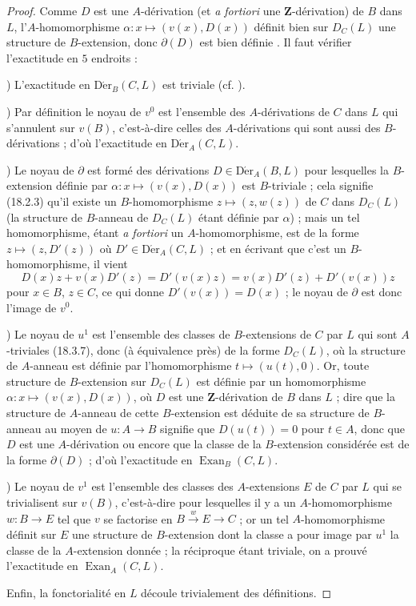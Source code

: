\begin{proof}
Comme $D$ est une $A$-dérivation (et \emph{a fortiori} une
$\mathbf{Z}$-dérivation) de $B$ dans $L$, l'$A$-homomorphisme
$\alpha:x\mapsto(v(x),D(x))$ définit bien sur $D_C(L)$ une structure de
$B$-extension, donc $\partial(D)$ est bien définie . Il
faut vérifier l'exactitude en $5$ endroits :

\medskip
{})\enspace
L'exactitude en $\operatorname{D\acute{e}r}_B(C,L)$ est triviale (cf.
).

\medskip
{})\enspace
Par définition  le noyau de $v^0$ est l'ensemble des
$A$-dérivations de $C$ dans $L$ qui s'annulent sur $v(B)$, c'est-à-dire
celles des $A$-dérivations qui sont aussi des $B$-dérivations
 ; d'où l'exactitude en $\operatorname{D\acute{e}r}_A(C,L)$.

\medskip
{})\enspace
Le noyau de $\partial$ est formé des dérivations
$D\in\operatorname{D\acute{e}r}_A(B,L)$ pour lesquelles la $B$-extension définie par
$\alpha:x\mapsto(v(x),D(x))$ est $B$-triviale ; cela signifie (18.2.3) qu'il
existe un $B$-homomorphisme $z\mapsto(z,w(z))$ de $C$ dans $D_C(L)$ (la
structure de $B$-anneau de $D_C(L)$ étant définie par $\alpha$) ; mais un tel
homomorphisme, étant \emph{a fortiori} un $A$-homomorphisme, est de la forme
$z\mapsto(z,D'(z))$ où $D'\in\operatorname{D\acute{e}r}_A(C,L)$
 ; et en écrivant que c'est un $B$-homomorphisme, il vient
\[
  D(x)z+v(x)D'(z)=D'(v(x)z)=v(x)D'(z)+D'(v(x))z
\]
pour $x\in B$, $z\in C$, ce qui donne $D'(v(x))=D(x)$ ; le noyau de
$\partial$ est donc l'image de $v^0$.

\medskip
{})\enspace
Le noyau de $u^1$ est l'ensemble des classes de $B$-extensions de $C$ par
$L$ qui sont $A$-triviales (18.3.7), donc (à équivalence près) de la forme
$D_C(L)$, où la structure de $A$-anneau est définie par l'homomorphisme
$t\mapsto(u(t),0)$. Or, toute structure de $B$-extension sur $D_C(L)$ est
définie par un homomorphisme $\alpha:x\mapsto(v(x),D(x))$, où $D$ est une
$\mathbf{Z}$-dérivation de $B$ dans $L$  ; dire que la
structure de $A$-anneau de cette $B$-extension est déduite de sa structure de
$B$-anneau au moyen de $u:A\to B$ signifie que $D(u(t))=0$ pour $t\in A$,
donc que $D$ est une $A$-dérivation ou encore que la classe de la $B$-extension
considérée est de la forme $\partial(D)$ ; d'où l'exactitude en
$\operatorname{Exan}_B(C,L)$.

\medskip
{})\enspace
Le noyau de $v^1$ est l'ensemble des classes des $A$-extensions $E$ de $C$
par $L$ qui se trivialisent sur $v(B)$, c'est-à-dire pour lesquelles il y a un
$A$-homomorphisme $w:B\to E$ tel que $v$ se factorise en
$B\xrightarrow{w}E\to C$ ; or un tel $A$-homomorphisme définit sur $E$ une
structure de $B$-extension dont la classe a pour image par $u^1$ la classe de
la $A$-extension donnée ; la réciproque étant triviale, on a prouvé
l'exactitude en $\operatorname{Exan}_A(C,L)$.

Enfin, la fonctorialité en $L$ découle trivialement des définitions.
\end{proof}

